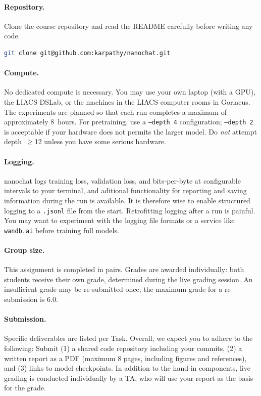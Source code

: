 \paragraph{Repository.}  Clone the course repository and read the README carefully before writing any code.

\begin{lstlisting}[language=bash, caption={Cloning the nanochat repository}]
git clone git@github.com:karpathy/nanochat.git
\end{lstlisting}

\paragraph{Compute.}  No dedicated compute is necessary. You may use your own laptop (with a GPU), the LIACS DSLab, or the machines in the LIACS computer rooms in Gorlaeus. 
The experiments are planned  so that each run completes a maximum of approximately 8~hours. For pretraining, use a \texttt{--depth~4} configuration; \texttt{--depth~2} is acceptable if your hardware does not permits the larger model. Do \emph{not} attempt depth~$\geq$12 unless you have some serious hardware.

\paragraph{Logging.}  nanochat logs training loss, validation loss, and bits-per-byte at configurable intervals to your terminal, and aditional functionality for reporting and saving information during the run is available. It is therefore wise to enable structured logging to a \texttt{.jsonl} file from the start. Retrofitting logging after a run is painful. You may want to experiment with the logging file formats or a service like \texttt{wandb.ai} before training full models.

\paragraph{Group size.}  This assignment is completed in pairs. Grades are awarded individually: both students receive their own grade, determined during the live grading session. An insufficient grade may be re-submitted once; the maximum grade for a re-submission is 6.0.

\paragraph{Submission.} Specific deliverables are listed per Task. Overall, we expect you to adhere to the following: Submit (1) a shared code repository including your commits, (2) a written report as a PDF (maximum 8 pages, including figures and references), and (3) links to model checkpoints. In addition to the hand-in components, live grading is conducted individually by a TA, who will use your report as the basis for the grade.

